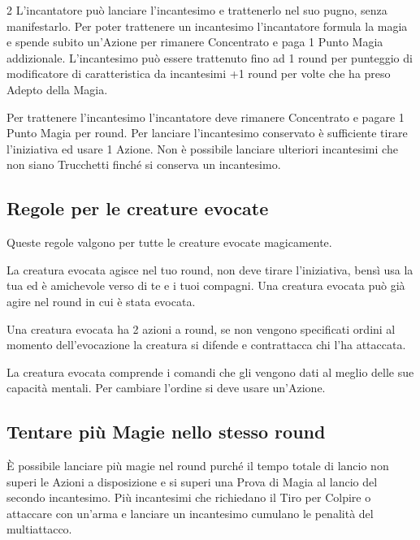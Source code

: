 \begin{multicols}{2}
L'incantatore può lanciare l'incantesimo e trattenerlo nel suo pugno, senza manifestarlo. Per poter trattenere un incantesimo l'incantatore formula la magia e spende subito un'Azione per rimanere Concentrato e paga 1 Punto Magia addizionale.
L'incantesimo può essere trattenuto fino ad 1 round per punteggio di modificatore di caratteristica da incantesimi +1 round per volte che ha preso Adepto della Magia.

Per trattenere l'incantesimo l'incantatore deve rimanere Concentrato e pagare 1 Punto Magia per round.
Per lanciare l'incantesimo conservato è sufficiente tirare l'iniziativa ed usare 1 Azione. Non è possibile lanciare ulteriori incantesimi che non siano Trucchetti finché si conserva un incantesimo.

\subsection{Regole per le creature evocate}

Queste regole valgono per tutte le creature evocate magicamente.

La creatura evocata agisce nel tuo round, non deve tirare l'iniziativa, bensì usa la tua ed è amichevole verso di te e i tuoi compagni. Una creatura evocata può già agire nel round in cui è stata evocata.

Una creatura evocata ha 2 azioni a round, se non vengono specificati ordini al momento dell'evocazione la creatura si difende e contrattacca chi l'ha attaccata.

La creatura evocata comprende i comandi che gli vengono dati al meglio delle sue capacità mentali. Per cambiare l'ordine si deve usare un'Azione.

\subsection{Tentare più Magie nello stesso round}\hypertarget{piumagieround}{}\label{piumagieround}

È possibile lanciare più magie nel round purché il tempo totale di lancio non superi le Azioni a disposizione e si superi una Prova di Magia al lancio del secondo incantesimo. Più incantesimi che richiedano il Tiro per Colpire o attaccare con un'arma e lanciare un incantesimo cumulano le penalità del multiattacco.


\end{multicols}

